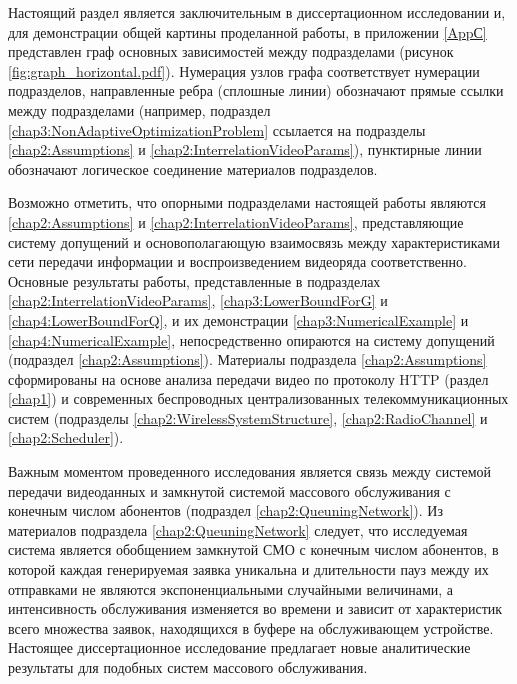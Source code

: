 Настоящий раздел является заключительным в диссертационном исследовании и, для демонстрации общей картины проделанной работы, в приложении \ref{AppС} представлен граф основных зависимостей между подразделами (рисунок \ref{fig:graph_horizontal.pdf}). Нумерация узлов графа соответствует нумерации подразделов, направленные ребра (сплошные линии) обозначают прямые ссылки между подразделами (например, подраздел \ref{chap3:NonAdaptiveOptimizationProblem} ссылается на подразделы \ref{chap2:Assumptions} и \ref{chap2:InterrelationVideoParams}), пунктирные линии обозначают логическое соединение материалов подразделов.

Возможно отметить, что опорными подразделами настоящей работы являются \ref{chap2:Assumptions} и \ref{chap2:InterrelationVideoParams}, представляющие систему допущений и основополагающую взаимосвязь между характеристиками сети передачи информации и воспроизведением видеоряда соответственно. Основные результаты работы, представленные в подразделах \ref{chap2:InterrelationVideoParams}, \ref{chap3:LowerBoundForG} и \ref{chap4:LowerBoundForQ}, и их демонстрации \ref{chap3:NumericalExample} и \ref{chap4:NumericalExample}, непосредственно опираются на систему допущений (подраздел \ref{chap2:Assumptions}). Материалы подраздела \ref{chap2:Assumptions} сформированы на основе анализа передачи видео по протоколу HTTP (раздел \ref{chap1}) и современных беспроводных централизованных телекоммуникационных систем (подразделы \ref{chap2:WirelessSystemStructure}, \ref{chap2:RadioChannel} и \ref{chap2:Scheduler}).

Важным моментом проведенного исследования является связь между системой передачи видеоданных и замкнутой системой массового обслуживания с конечным числом абонентов (подраздел \ref{chap2:QueuningNetwork}). Из материалов подраздела \ref{chap2:QueuningNetwork} следует, что исследуемая система является обобщением замкнутой СМО с конечным числом абонентов, в которой каждая генерируемая заявка уникальна и длительности пауз между их отправками не являются экспоненциальными случайными величинами, а интенсивность обслуживания изменяется во времени и зависит от характеристик всего множества заявок, находящихся в буфере на обслуживающем устройстве. Настоящее диссертационное исследование предлагает новые аналитические результаты для подобных систем массового обслуживания.